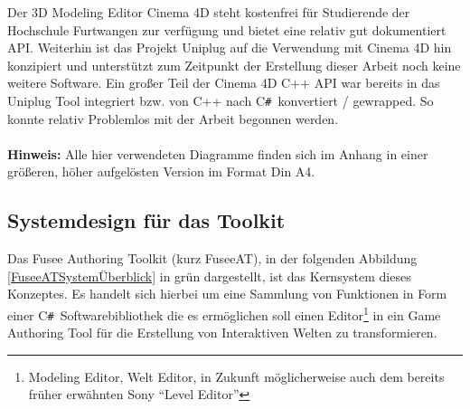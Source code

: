 \documentclass[pagesize, paper=a4, fontsize=12pt, titlepage=true, headings=small, headnosepline, abstractoff, liststotoc, nochapterprefix, plainheadsepline, twoside]{scrreprt}
\newcommand{\CSS}{C\texttt{\# }}
\begin{document}
Der 3D Modeling Editor Cinema 4D steht kostenfrei für Studierende der Hochschule Furtwangen zur verfügung und bietet eine relativ gut dokumentiert API. Weiterhin ist das Projekt Uniplug auf die Verwendung mit Cinema 4D hin konzipiert und unterstützt zum Zeitpunkt der Erstellung dieser Arbeit noch keine weitere Software. Ein großer Teil der Cinema 4D C++ API war bereits in das Uniplug Tool integriert bzw. von C++ nach \CSS konvertiert / gewrapped. So konnte relativ Problemlos mit der Arbeit begonnen werden.
\\
\\
\textbf{Hinweis:} Alle hier verwendeten Diagramme finden sich im Anhang in einer größeren, höher aufgelösten Version im Format Din A4.

\subsection{Systemdesign für das Toolkit}
Das Fusee Authoring Toolkit (kurz FuseeAT), in der folgenden Abbildung \ref{FuseeATSystemÜberblick} in grün dargestellt, ist das Kernsystem dieses Konzeptes. Es handelt sich hierbei um eine Sammlung von Funktionen in Form einer \CSS Softwarebibliothek die es ermöglichen soll einen Editor\footnote{Modeling Editor, Welt Editor, in Zukunft  möglicherweise auch dem bereits früher erwähnten Sony “Level Editor”} in ein Game Authoring Tool für die Erstellung von Interaktiven Welten zu transformieren.
\end{document}
